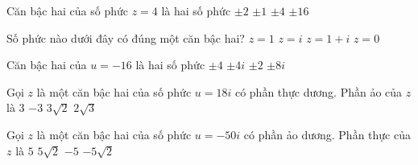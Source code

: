 \begin{ex}%
    Căn bậc hai của số phức $z=4$ là hai số phức
    \choice
    {\True $\pm 2$}
    {$\pm 1$}
    {$\pm 4$}
    {$\pm 16$}
\end{ex}

\begin{ex}%
    Số phức nào dưới đây có đúng một căn bậc hai?
    \choice
    {$z=1$}
    {$z=i$}
    {$z=1+i$}
    {\True $z=0$}
\end{ex}

\begin{ex}%
    Căn bậc hai của $u=-16$ là hai số phức
    \choice
    {$\pm 4$}
    {\True $\pm 4i$}
    {$\pm 2$}
    {$\pm 8i$}
\end{ex}

\begin{ex}%
    Gọi $z$ là một căn bậc hai của số phức $u=18i$ có phần thực dương. Phần ảo của $z$ là
    \choice
    {$3$}
    {$-3$}
    {$3\sqrt2$}
    {$2\sqrt3$}
\end{ex}

\begin{ex}%
    Gọi $z$ là một căn bậc hai của số phức $u=-50i$ có phần ảo dương. Phần thực của $z$ là
    \choice
    {$5$}
    {$5\sqrt2$}
    {\True $-5$}
    {$-5\sqrt2$}
\end{ex}

